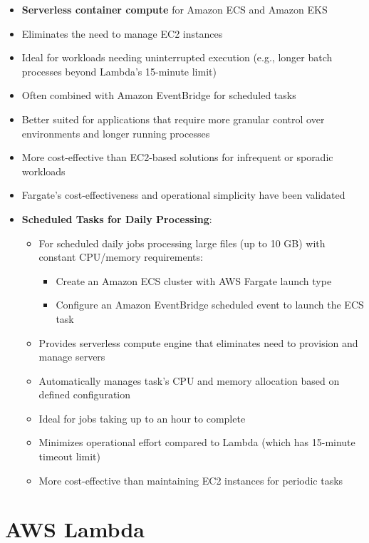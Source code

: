 \documentclass[11pt,a4paper]{report}
\begin{document}
\begin{itemize}
  \item \textbf{Serverless container compute} for Amazon ECS and Amazon EKS
  \item Eliminates the need to manage EC2 instances
  \item Ideal for workloads needing uninterrupted execution (e.g., longer batch processes beyond Lambda's 15-minute limit)
  \item Often combined with Amazon EventBridge for scheduled tasks
  \item Better suited for applications that require more granular control over environments and longer running processes
  \item More cost-effective than EC2-based solutions for infrequent or sporadic workloads
  \item Fargate's cost-effectiveness and operational simplicity have been validated
  \item \textbf{Scheduled Tasks for Daily Processing}:
\begin{itemize}
  \item For scheduled daily jobs processing large files (up to 10 GB) with constant CPU/memory requirements:
\begin{itemize}
  \item Create an Amazon ECS cluster with AWS Fargate launch type
  \item Configure an Amazon EventBridge scheduled event to launch the ECS task
\end{itemize}
  \item Provides serverless compute engine that eliminates need to provision and manage servers
  \item Automatically manages task's CPU and memory allocation based on defined configuration
  \item Ideal for jobs taking up to an hour to complete
  \item Minimizes operational effort compared to Lambda (which has 15-minute timeout limit)
  \item More cost-effective than maintaining EC2 instances for periodic tasks
\end{itemize}
\end{itemize}

\section{AWS Lambda}
\end{document}
